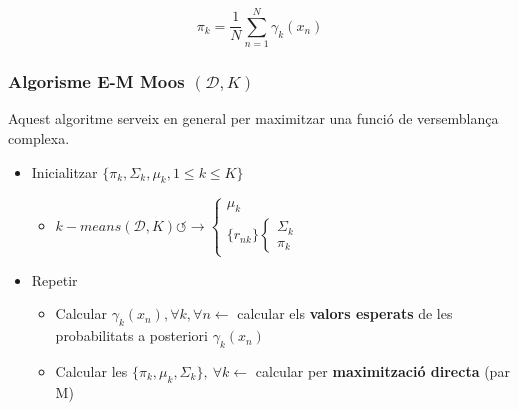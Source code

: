 \documentclass[a4paper]{article}
\begin{document}
$$
\boxed{\pi_k = \frac{1}{N} \sum_{n=1}^N \gamma_k(x_n)}
$$

\subsubsection{Algorisme E-M Moos $(\mathcal{D},K)$}

Aquest algoritme serveix en general per maximitzar una funció de versemblança complexa.

\begin{itemize}
	\item Inicialitzar $ \{ \pi_k, \Sigma_k, \mu_k, 1 \le k \le K \} $
	\begin{itemize}
		\item $k-means(\mathcal{D},K) \circlearrowleft \rightarrow 
		\begin{cases}
			\mu_k \\
			\{ r_{nk} \} 
			\begin{cases}
				\Sigma_k \\
				\pi_k
			\end{cases}
		\end{cases}$
	\end{itemize}
	\item Repetir
	\begin{itemize}
		\item Calcular $\gamma_k(x_n), \forall k, \forall n \leftarrow$ calcular els \textbf{valors esperats} de les probabilitats a posteriori $\gamma_k (x_n)$
		\item Calcular les $ \{ \pi_k, \mu_k, \Sigma_k \},\ \forall k \leftarrow $ calcular per \textbf{maximització directa} (par M)
	\end{itemize}
\end{itemize}
\end{document}
